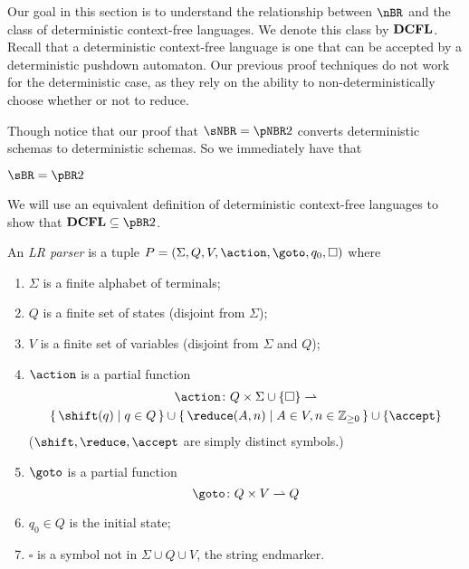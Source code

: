 \documentclass{llncs}
\begin{document}
Our goal in this section is to understand the relationship between $\nBR$ and the class of deterministic context-free languages.
We denote this class by $\hbox{{\bf DCFL}}$.
Recall that a deterministic context-free language is one that can be accepted by a deterministic pushdown automaton.
Our previous proof techniques do not work for the deterministic case, as they rely on the ability to non-deterministically
choose whether or not to reduce.

Though notice that our proof that $\sNBR=\pNBR2$ converts deterministic schemas to deterministic schemas.
So we immediately have that

\begin{lemma}

    $\sBR=\pBR2$

\end{lemma}

We will use an equivalent definition of deterministic context-free languages to show that $\DCFL\subseteq\pBR2$.

\begin{definition}

    An \emph{LR parser} is a tuple $P=(\Sigma,Q,V,\action,\goto,q_0,\square)$ where
    \begin{enumerate}
        \item $\Sigma$ is a finite alphabet of terminals;
        \item $Q$ is a finite set of states (disjoint from $\Sigma$);
        \item $V$ is a finite set of variables (disjoint from $\Sigma$ and $Q$);
        \item $\action$ is a partial function
        \begin{multline*}
            \action\colon Q\times\Sigma\cup\set\square\partial\\
            \set{\shift(q)}[q\in Q]\cup\set{\reduce(A,n)}[A\in V,n\in{\bb Z}_{\geq0}]\cup\set\accept
        \end{multline*}
        ($\shift,\reduce,\accept$ are simply distinct symbols.)
        \item $\goto$ is a partial function
        $$ \goto\colon Q\times V \partial Q $$
        \item $q_0\in Q$ is the initial state;
        \item $\square$ is a symbol not in $\Sigma\cup Q\cup V$, the string endmarker.
    \end{enumerate}

\end{definition}
\end{document}
